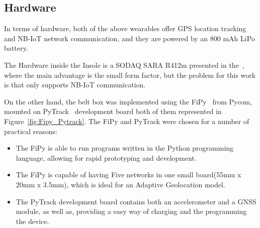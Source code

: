 \subsection{Hardware}
\label{susec:Hardware}

In terms of hardware, both of the above wearables offer GPS location tracking and NB-IoT network communication, and they are powered by an 800 mAh LiPo battery. 

The Hardware inside the Insole is a SODAQ SARA R412m presented in the~, where the main advantage is the small form factor, but the problem for this work is that only supports NB-IoT communication.

On the other hand, the belt box was implemented using the FiPy~\cite{Microcontroller2017,Fipy} from Pycom, mounted on PyTrack~\cite{Pytrack} development board both of them represented in Figure~\ref{fig:Fipy_Pytrack}. The FiPy and PyTrack were chosen for a number of practical reasons:
\begin{itemize}
  \item The FiPy is able to run programs written in the Python programming language, allowing for rapid prototyping and development.
  \item The FiPy is capable of having Five networks in one small board(55mm x 20mm x 3.5mm), which is ideal for an Adaptive Geolocation model.
  \item The PyTrack development board contains both an accelerometer and a GNSS module, as well as, providing a easy way of charging and the programming the device.
\end{itemize}
